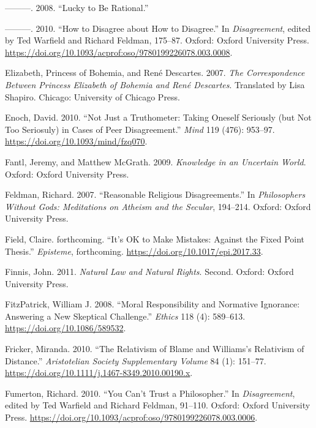 \documentclass[
  10pt,
  letterpaper,
  twoside]{scrbook}
\newlength{\cslhangindent}
\newenvironment{CSLReferences}[2] %
 {\begin{list}{}{%
  \setlength{\itemindent}{0pt}
  \setlength{\leftmargin}{0pt}
  \setlength{\parsep}{0pt}
  \ifodd #1
   \setlength{\leftmargin}{\cslhangindent}
   \setlength{\itemindent}{-1\cslhangindent}
  \fi
  \setlength{\itemsep}{#2\baselineskip}}}
 {\end{list}}
\begin{document}
\begin{CSLReferences}{1}{0}
---------. 2008. {``Lucky to Be Rational.''}

---------. 2010. {``How to Disagree about How to Disagree.''} In
\emph{Disagreement}, edited by Ted Warfield and Richard Feldman,
175--87. Oxford: Oxford University Press.
\url{https://doi.org/10.1093/acprof:oso/9780199226078.003.0008}.

Elizabeth, Princess of Bohemia, and René Descartes. 2007. \emph{The
Correspondence Between Princess Elizabeth of Bohemia and Ren{é}
Descartes}. Translated by Lisa Shapiro. Chicago: University of Chicago
Press.

Enoch, David. 2010. {``Not Just a Truthometer: Taking Oneself Seriously
(but Not Too Seriosuly) in Cases of Peer Disagreement.''} \emph{Mind}
119 (476): 953--97. \url{https://doi.org/10.1093/mind/fzq070}.

Fantl, Jeremy, and Matthew McGrath. 2009. \emph{Knowledge in an
Uncertain World}. Oxford: Oxford University Press.

Feldman, Richard. 2007. {``Reasonable Religious Disagreements.''} In
\emph{Philosophers Without Gods: Meditations on Atheism and the
Secular}, 194--214. Oxford: Oxford University Press.

Field, Claire. forthcoming. {``It's OK to Make Mistakes: Against the
Fixed Point Thesis.''} \emph{Episteme}, forthcoming.
\url{https://doi.org/10.1017/epi.2017.33}.

Finnis, John. 2011. \emph{Natural Law and Natural Rights}. Second.
Oxford: Oxford University Press.

FitzPatrick, William J. 2008. {``Moral Responsibility and Normative
Ignorance: Answering a New Skeptical Challenge.''} \emph{Ethics} 118
(4): 589--613. \url{https://doi.org/10.1086/589532}.

Fricker, Miranda. 2010. {``The Relativism of Blame and Williams's
Relativism of Distance.''} \emph{Aristotelian Society Supplementary
Volume} 84 (1): 151--77.
\url{https://doi.org/10.1111/j.1467-8349.2010.00190.x}.

Fumerton, Richard. 2010. {``You Can't Trust a Philosopher.''} In
\emph{Disagreement}, edited by Ted Warfield and Richard Feldman,
91--110. Oxford: Oxford University Press.
\url{https://doi.org/10.1093/acprof:oso/9780199226078.003.0006}.


\end{CSLReferences}
\end{document}
